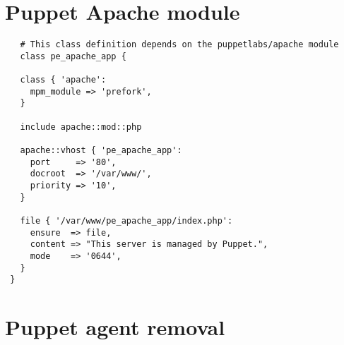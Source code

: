 \begin{appendices}
  \renewcommand\thetable{\thesection\arabic{table}}
  \renewcommand\thefigure{\thesection\arabic{figure}}

  \section{Puppet Apache module} \label{app:puppetmodule}
  \begin{lstlisting}
   # This class definition depends on the puppetlabs/apache module
   class pe_apache_app {

   class { 'apache':
     mpm_module => 'prefork',
   }

   include apache::mod::php

   apache::vhost { 'pe_apache_app':
     port     => '80',
     docroot  => '/var/www/',
     priority => '10',
   }

   file { '/var/www/pe_apache_app/index.php':
     ensure  => file,
     content => "This server is managed by Puppet.",
     mode    => '0644',
   }
 }
  \end{lstlisting}
  \newpage

  \section{Puppet agent removal} \label{app:puppetagent}
  \begin{lstlisting}
  
  \end{lstlisting}

\end{appendices}



